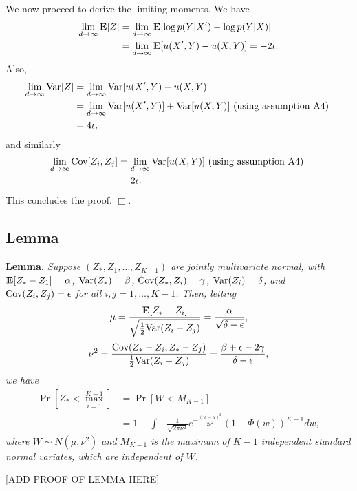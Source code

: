 \documentclass[12pt]{article}
\begin{document}
We now proceed to derive the limiting moments.
We have
\begin{align*}
\lim_{d \to \infty} \textbf{E}[Z] 
&= \lim_{d \to \infty} \textbf{E}[ \log p(Y|X') - \log p(Y|X)]
\\&= \lim_{d \to \infty} \textbf{E}[ u(X', Y) - u(X, Y) ] = -2\iota.
\end{align*}
Also,
\begin{align*}
\lim_{d \to \infty} \text{Var}[Z]
 &= \lim_{d \to \infty} \text{Var}[ u(X', Y) - u(X, Y) ]
\\&= \lim_{d \to \infty} \text{Var}[ u(X', Y)] +\text{Var}[ u(X, Y) ]\text{ (using assumption A4) }
\\&= 4\iota,
\end{align*}
and similarly
\begin{align*}
\lim_{d \to \infty} \text{Cov}[Z_i, Z_j]
&= \lim_{d \to \infty} \text{Var}[ u(X, Y)]\text{ (using assumption A4) }
\\&= 2\iota.
\end{align*}
This concludes the proof. $\Box$.


\subsection{Lemma}

\textbf{Lemma. }
\emph{
Suppose $(Z_*, Z_1, \hdots, Z_{K-1})$ are jointly multivariate normal, with 
$\textbf{E}[Z_* - Z_1]= \alpha$, 
$\text{Var}(Z_*) = \beta$, 
$\text{Cov}(Z_*, Z_i) = \gamma$, 
$\text{Var}(Z_i)= \delta$, and $\text{Cov}(Z_i, Z_j) = \epsilon$ for all $i, j = 1, \hdots,
K-1$.  Then, letting
\[
\mu = \frac{\textbf{E}[Z_* - Z_i]}{\sqrt{\frac{1}{2}\text{Var}(Z_i - Z_j)}} = \frac{\alpha}{\sqrt{\delta - \epsilon}},
\]
\[
\nu^2 = \frac{\text{Cov}(Z_* -Z_i, Z_* - Z_j)}{\frac{1}{2}\text{Var}(Z_i - Z_j)} = \frac{\beta + \epsilon - 2\gamma}{\delta - \epsilon},
\]
we have
\begin{align*}
\Pr[Z_* < \max_{i=1}^{K-1}] &= \Pr[W < M_{K-1}]
\\&= 1 - \int -\frac{1}{\sqrt{2\pi\nu^2}} e^{-\frac{(w-\mu)^2}{2\nu^2}} (1-\Phi(w))^{K-1} dw,
\end{align*}
where $W \sim N(\mu, \nu^2)$ and $M_{K-1}$ is the maximum of $K-1$
independent standard normal variates, which are independent of $W$.
}

[ADD PROOF OF LEMMA HERE]
\end{document}
